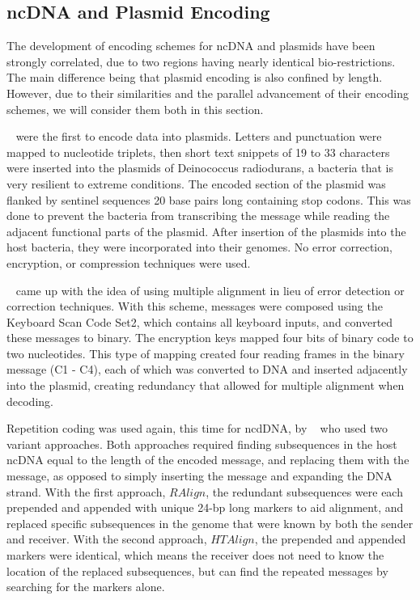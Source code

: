 \documentclass{bioinfo}
\begin{document}
\subsection{ncDNA and Plasmid Encoding}

The development of encoding schemes for ncDNA and plasmids have been strongly correlated, due to two regions having nearly identical bio-restrictions. The main difference being that plasmid encoding is also confined by length. However, due to their similarities and the parallel advancement of their encoding schemes, we will consider them both in this section.

~\cite{WWF2003COTACM} were the first to encode data into plasmids. Letters and punctuation were mapped to nucleotide triplets, then short text snippets of 19 to 33 characters were inserted into the plasmids of Deinococcus radiodurans, a bacteria that is very resilient to extreme conditions. The encoded section of the plasmid was flanked by sentinel sequences 20 base pairs long containing stop codons. This was done to prevent the bacteria from transcribing the message while reading the adjacent functional parts of the plasmid. After insertion of the plasmids into the host bacteria, they were incorporated into their genomes. No error correction, encryption, or compression techniques were used.

~\cite{YSSOT2007BP} came up with the idea of using multiple alignment in lieu of error detection or correction techniques. With this scheme, messages were composed using the Keyboard Scan Code Set2, which contains all keyboard inputs, and converted these messages to binary. The encryption keys mapped four bits of binary code to two nucleotides. This type of mapping created four reading frames in the binary message (C1 - C4), each of which was converted to DNA and inserted adjacently into the plasmid, creating redundancy that allowed for multiple alignment when decoding.

Repetition coding was used again, this time for ncdDNA, by ~\cite{HB2011IEEEICOBAB} who used two variant approaches. Both approaches required finding subsequences in the host ncDNA equal to the length of the encoded message, and replacing them with the message, as opposed to simply inserting the message and expanding the DNA strand. With the first approach, $RAlign$, the redundant subsequences were each prepended and appended with unique 24-bp long markers to aid alignment, and replaced specific subsequences in the genome that were known by both the sender and receiver. With the second approach, $HTAlign$, the prepended and appended markers were identical, which means the receiver does not need to know the location of the replaced subsequences, but can find the repeated messages by searching for the markers alone.
\end{document}
